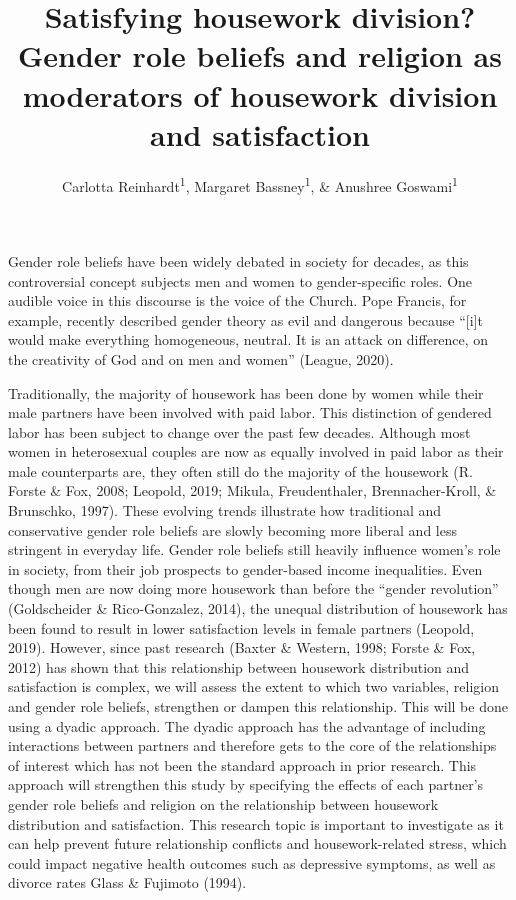 \documentclass[
  man,floatsintext]{apa6}
\title{Satisfying housework division? Gender role beliefs and religion as moderators of housework division and satisfaction}
\author{Carlotta Reinhardt\textsuperscript{1}, Margaret Bassney\textsuperscript{1}, \& Anushree Goswami\textsuperscript{1}}
\date{}
\affiliation{\vspace{0.5cm}\textsuperscript{1} Smith College}
\begin{document}
\maketitle

Gender role beliefs have been widely debated in society for decades, as this controversial concept subjects men and women to gender-specific roles. One audible voice in this discourse is the voice of the Church. Pope Francis, for example, recently described gender theory as evil and dangerous because ``{[}i{]}t would make everything homogeneous, neutral. It is an attack on difference, on the creativity of God and on men and women'' (League, 2020).

Traditionally, the majority of housework has been done by women while their male partners have been involved with paid labor. This distinction of gendered labor has been subject to change over the past few decades. Although most women in heterosexual couples are now as equally involved in paid labor as their male counterparts are, they often still do the majority of the housework (R. Forste \& Fox, 2008; Leopold, 2019; Mikula, Freudenthaler, Brennacher-Kroll, \& Brunschko, 1997). These evolving trends illustrate how traditional and conservative gender role beliefs are slowly becoming more liberal and less stringent in everyday life. Gender role beliefs still heavily influence women's role in society, from their job prospects to gender-based income inequalities. Even though men are now doing more housework than before the ``gender revolution'' (Goldscheider \& Rico-Gonzalez, 2014), the unequal distribution of housework has been found to result in lower satisfaction levels in female partners (Leopold, 2019). However, since past research (Baxter \& Western, 1998; Forste \& Fox, 2012) has shown that this relationship between housework distribution and satisfaction is complex, we will assess the extent to which two variables, religion and gender role beliefs, strengthen or dampen this relationship.
This will be done using a dyadic approach. The dyadic approach has the advantage of including interactions between partners and therefore gets to the core of the relationships of interest which has not been the standard approach in prior research. This approach will strengthen this study by specifying the effects of each partner's gender role beliefs and religion on the relationship between housework distribution and satisfaction.
This research topic is important to investigate as it can help prevent future relationship conflicts and housework-related stress, which could impact negative health outcomes such as depressive symptoms, as well as divorce rates Glass \& Fujimoto (1994).
\end{document}
